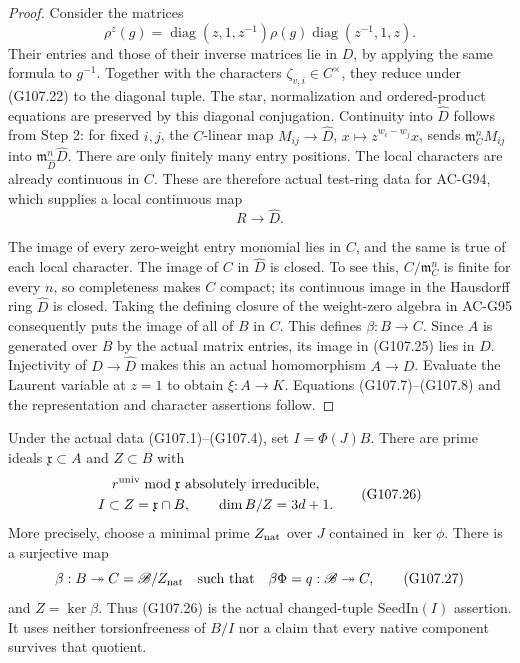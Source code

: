 \begin{proof}
Consider the matrices
\[
 \rho^z(g)=
 \operatorname{diag}(z,1,z^{-1})\rho(g)
 \operatorname{diag}(z^{-1},1,z).
 \tag{G107.24}
\]
Their entries and those of their inverse matrices lie
in \(D\), by applying the same formula to \(g^{-1}\).
Together with the characters \(\zeta_{v,i}\in C^\times\),
they reduce under (G107.22) to the diagonal tuple.
The star, normalization and ordered-product equations
are preserved by this diagonal conjugation.
Continuity into \(\widehat D\) follows from Step 2:
for fixed \(i,j\), the \(C\)-linear map
\(M_{ij}\to\widehat D\), \(x\mapsto z^{w_i-w_j}x\),
sends \(\mathfrak m_C^nM_{ij}\) into
\(\mathfrak m_{\widehat D}^n\widehat D\).
There are only finitely many entry positions.
The local characters are already continuous in \(C\).
These are therefore actual test-ring data for AC-G94,
which supplies a local continuous map
\[
                         R\longrightarrow\widehat D.
 \tag{G107.25}
\]

The image of every zero-weight entry monomial lies in
\(C\), and the same is true of each local character.
The image of \(C\) in \(\widehat D\) is closed.
To see this, \(C/\mathfrak m_C^n\) is finite for every
\(n\), so completeness makes \(C\) compact; its
continuous image in the Hausdorff ring \(\widehat D\)
is closed.  Taking the defining closure of the
weight-zero algebra in AC-G95 consequently puts the
image of all of \(B\) in \(C\).
This defines \(\beta:B\to C\).
Since \(A\) is generated over \(B\) by the actual
matrix entries, its image in (G107.25) lies in \(D\).
Injectivity of \(D\to\widehat D\) makes this an
actual homomorphism \(A\to D\).
Evaluate the Laurent variable at \(z=1\) to obtain
\(\xi:A\to K\).  Equations (G107.7)--(G107.8) and
the representation and character assertions follow.
\end{proof}

\begin{theorem}
\label{AC-G107-seed}
Under the actual data (G107.1)--(G107.4), set
\(I=\Phi(J)B\).
There are prime ideals \(\mathfrak x\subset A\) and
\(Z\subset B\) with
\[
 \begin{gathered}
 r^{\rm univ}\bmod\mathfrak x\text{ absolutely irreducible},\\
 I\subset Z=\mathfrak x\cap B,\qquad
                         \dim B/Z=3d+1.
 \end{gathered}
 \tag{G107.26}
\]
More precisely, choose a minimal prime
\(Z_{\rm nat}\) over \(J\) contained in \(\ker\phi\).
There is a surjective map
\[
 \beta:B\twoheadrightarrow C=\mathscr B/Z_{\rm nat}
 \quad\text{such that}\quad
           \beta\Phi=q:\mathscr B\twoheadrightarrow C,
 \tag{G107.27}
\]
and \(Z=\ker\beta\).
Thus (G107.26) is the actual changed-tuple
\(\mathrm{SeedIn}(I)\) assertion.
It uses neither torsionfreeness of \(B/I\) nor a claim
that every native component survives that quotient.
\end{theorem}

